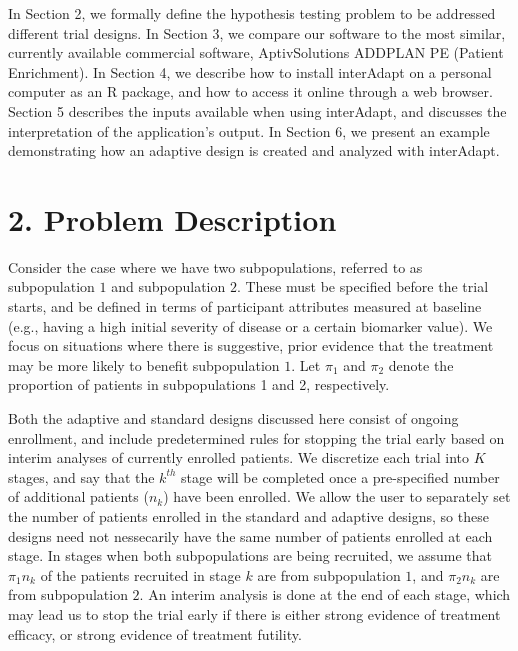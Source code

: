 \documentclass{article}
\newcommand{\interAdapt}{\textsf{interAdapt }}
\begin{document}
In Section 2, we  formally define the hypothesis testing problem to be addressed different trial designs. In Section 3, we compare our software to the most similar, currently available commercial software, AptivSolutions ADDPLAN PE (Patient Enrichment). 
In Section 4, we describe how to install \interAdapt on a personal computer as an R package, and how to access it online through a web browser. Section 5 describes the inputs available when using \textsf{interAdapt}, and discusses the interpretation of the application's output. In Section 6, we present an example demonstrating how an adaptive design is  created and analyzed with \textsf{interAdapt}. 

\section*{2. Problem Description}

Consider the case where we have two subpopulations, referred to as subpopulation $1$ and subpopulation $2$. These must be specified before the trial starts, and be defined in terms of participant attributes measured at baseline (e.g., having a high initial severity of disease or a certain biomarker value). 
We focus on situations where  there is suggestive, prior evidence that the treatment may be more likely to benefit subpopulation $1$.
Let $π_1$ and $π_2$ denote the proportion of patients in subpopulations 1 and 2, respectively. 

Both the adaptive and standard designs discussed here consist of ongoing enrollment, and include predetermined rules for stopping the trial early based on interim analyses of currently enrolled patients. We discretize each trial into $K$ stages, and say that the $k ^{th}$ stage will be completed once a pre-specified number of additional patients ($n_k$) have been enrolled. We allow the user to separately set the number of patients enrolled in the standard and adaptive designs, so these designs need not nessecarily have the same number of patients enrolled at each stage. In stages when both subpopulations are being recruited, we assume that $π_1 n_k$ of the patients recruited in stage $k$ are from subpopulation $1$, and $π_2n_k$ are from subpopulation $2$. An interim analysis is done at the end of each stage, which may lead us to stop the trial early if there is either strong evidence of treatment efficacy, or strong evidence of treatment futility.
\end{document}
